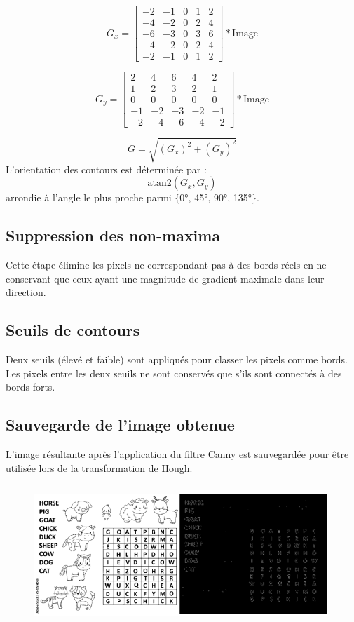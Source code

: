 \[G_x = \begin{bmatrix} 
-2 & -1 & 0 & 1 & 2 \\
-4 & -2 & 0 & 2 & 4 \\
-6 & -3 & 0 & 3 & 6 \\
-4 & -2 & 0 & 2 & 4 \\
-2 & -1 & 0 & 1 & 2
\end{bmatrix} * \text{Image}\]

\[G_y = \begin{bmatrix}
2 & 4 & 6 & 4 & 2 \\
1 & 2 & 3 & 2 & 1 \\
0 & 0 & 0 & 0 & 0 \\
-1 & -2 & -3 & -2 & -1 \\
-2 & -4 & -6 & -4 & -2
\end{bmatrix} * \text{Image}\]

\[
G = \sqrt{(G_x)^2 + (G_y)^2}
\]
L'orientation des contours est déterminée par :
\[
\text{atan2}(G_x, G_y)
\]
arrondie à l'angle le plus proche parmi $\{$0°, 45°, 90°, 135°$\}$.

\subsection{Suppression des non-maxima}

Cette étape élimine les pixels ne correspondant pas à des bords réels en ne conservant que ceux ayant une magnitude de gradient maximale dans leur direction.

\subsection{Seuils de contours}

Deux seuils (élevé et faible) sont appliqués pour classer les pixels comme bords. Les pixels entre les deux seuils ne sont conservés que s'ils sont connectés à des bords forts.

\subsection{Sauvegarde de l'image obtenue}

L'image résultante après l'application du filtre Canny est sauvegardée pour être utilisée lors de la transformation de Hough.

\begin{figure}[hbt]
	\centering
	\includegraphics[width=420px,height=200px]{obrazky-figures/6.png}
\end{figure}

